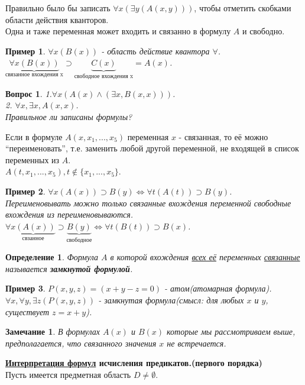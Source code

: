 \documentclass{article}
\newtheorem{example}{Пример}
\newtheorem{question}{Вопрос}
\newtheorem{Remark}{Замечание}
\newtheorem{definition}{Определение}
\numberwithin{example}{section}
\numberwithin{question}{section}
\numberwithin{Remark}{section}
\numberwithin{theorem}{section}
\numberwithin{definition}{section}
\numberwithin{proposition}{section}
\begin{document}
	Правильно было бы записать $\forall x(\exists y(A(x,y)))$, чтобы отметить скобками области действия кванторов.\\
	Одна и таже переменная может входить и связанно в формулу $A$ и свободно.
	\begin{example}
		$\forall x(B(x))$ - область действие квантора $\forall$.\\
		$\underbrace{\forall x(B(x))}_{\text{связанное вхождения x}}\supset \underbrace{C(x)}_{\text{свободное вхождения x}}=A(x)$.
	\end{example}
	\begin{question}
		1.$\forall x(A(x)\land (\exists x,B(x,x)))$.\\
		2. $\forall x,\exists x, A(x,x)$.\\
		Правильное ли записаны формулы?
	\end{question}
	Если в формуле $A(x,x_1,...,x_5)$ переменная $x$ - связанная, то её можно ``переименовать'', т.е. заменить любой другой переменной, не входящей в список переменных из $A$.\\
	$A(t,x_1,...,x_5),t\notin \{x_1,...,x_5\}$.
	\begin{example}
		$\forall x(A(x))\supset B(y)\Leftrightarrow \forall t(A(t))\supset B(y)$.\\
		Переименовывать можно только связанные вхождения переменной свободные вхождения из переименовываются.\\
		$\forall \underbrace{x(A(x))}_{\text{свзанное}}\supset \underbrace{B(y)}_{\text{свободное}}\Leftrightarrow \forall t(B(t))\supset B(x)$.
	\end{example}
	\begin{definition}
	Формула $A$ в которой вхождения \underline{всех её} переменных \underline{связанные} называется \textbf{замкнутой формулой}.  
	\end{definition}
	\begin{example}
		$P(x,y,z)=(x+y-z=0)$ - атом(атомарная формула).\\
		$\forall x, \forall y,\exists z (P(x,y,z))$ - замкнутая формула(смысл: для любых $x$ и $y$, существует $z=x+y$).
	\end{example}
	\begin{Remark}
		В формулах $A(x)$ и $B(x)$ которые мы рассмотриваем выше, предполагается, что связанного значения $x$ не встречается.
	\end{Remark}
	\textbf{\underline{Интерпретация формул} исчисления предикатов.(первого порядка)}\\
	Пусть имеется предметная область $D\ne \emptyset$.\\
\end{document}
